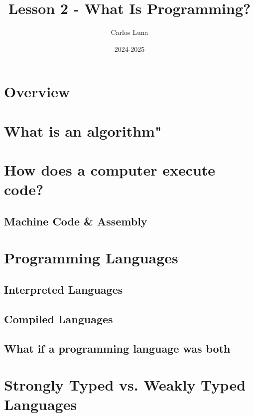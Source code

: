 \documentclass[11pt]{article}
\title{Lesson 2 - What Is Programming?}
\author{Carlos Luna}
\date{2024-2025}
\begin{document}
\maketitle
\tableofcontents

\newpage

\section{Overview}
\section{What is an algorithm"}
\section{How does a computer execute code?}
\subsection{Machine Code \& Assembly}
\section{Programming Languages}
\subsection{Interpreted Languages}
\subsection{Compiled Languages}
\subsection{What if a programming language was both}

\section{Strongly Typed vs. Weakly Typed Languages}
\end{document}
